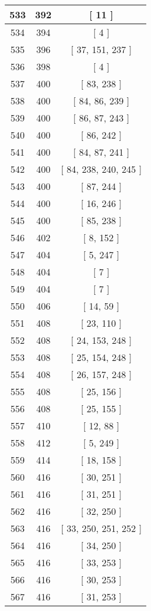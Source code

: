 \begin{center}
\begin{longtable}[H]{|| c c c ||}
\hline
533 & 392 & [ 11 ] \\ 
\hline
534 & 394 & [ 4 ] \\ 
\hline
535 & 396 & [ 37, 151, 237 ] \\ 
\hline
536 & 398 & [ 4 ] \\ 
\hline
537 & 400 & [ 83, 238 ] \\ 
\hline
538 & 400 & [ 84, 86, 239 ] \\ 
\hline
539 & 400 & [ 86, 87, 243 ] \\ 
\hline
540 & 400 & [ 86, 242 ] \\ 
\hline
541 & 400 & [ 84, 87, 241 ] \\ 
\hline
542 & 400 & [ 84, 238, 240, 245 ] \\ 
\hline
543 & 400 & [ 87, 244 ] \\ 
\hline
544 & 400 & [ 16, 246 ] \\ 
\hline
545 & 400 & [ 85, 238 ] \\ 
\hline
546 & 402 & [ 8, 152 ] \\ 
\hline
547 & 404 & [ 5, 247 ] \\ 
\hline
548 & 404 & [ 7 ] \\ 
\hline
549 & 404 & [ 7 ] \\ 
\hline
550 & 406 & [ 14, 59 ] \\ 
\hline
551 & 408 & [ 23, 110 ] \\ 
\hline
552 & 408 & [ 24, 153, 248 ] \\ 
\hline
553 & 408 & [ 25, 154, 248 ] \\ 
\hline
554 & 408 & [ 26, 157, 248 ] \\ 
\hline
555 & 408 & [ 25, 156 ] \\ 
\hline
556 & 408 & [ 25, 155 ] \\ 
\hline
557 & 410 & [ 12, 88 ] \\ 
\hline
558 & 412 & [ 5, 249 ] \\ 
\hline
559 & 414 & [ 18, 158 ] \\ 
\hline
560 & 416 & [ 30, 251 ] \\ 
\hline
561 & 416 & [ 31, 251 ] \\ 
\hline
562 & 416 & [ 32, 250 ] \\ 
\hline
563 & 416 & [ 33, 250, 251, 252 ] \\ 
\hline
564 & 416 & [ 34, 250 ] \\ 
\hline
565 & 416 & [ 33, 253 ] \\ 
\hline
566 & 416 & [ 30, 253 ] \\ 
\hline
567 & 416 & [ 31, 253 ] \\ 

\end{longtable}
\end{center}
